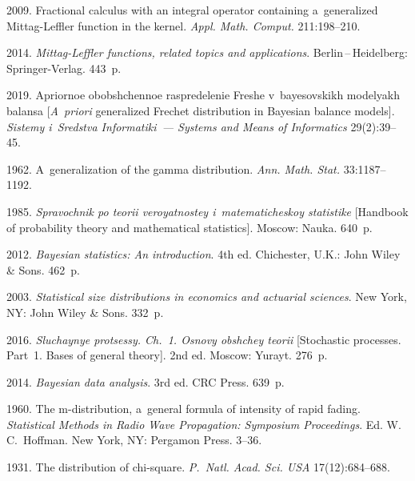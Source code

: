 \begin{multicols}{2}
{{\begin{thebibliography}{99}
 2009. Fractional calculus with 
an integral operator containing a~generalized Mittag-Leffler function in the kernel. 
 \textit{Appl. Math. Comput.} 211:198--210.

 2014.  \textit{Mittag-Leffler functions, related topics and applications}. 
 Berlin\,--\,Heidelberg: Springer-Verlag. 443~p.

 2019. Apriornoe obobshchennoe raspredelenie Freshe v~bayesovskikh modelyakh 
 balansa [\textit{A~priori} generalized Frechet distribution in Bayesian balance models]. 
  \textit{Sistemy i~Sredstva Informatiki~--- Systems and Means of Informatics}
   29(2):39--45.

 1962. A~generalization of the gamma distribution.
  \textit{Ann. Math. Stat.} 33:1187--1192.

 1985.  \textit{Spravochnik po teorii veroyatnostey i~matematicheskoy statistike} 
 [Handbook of probability theory and mathematical statistics]. 
 Moscow: Nauka. 640~p.

 2012. 
\textit{Bayesian statistics: An introduction}. 4th ed. 
Chichester, U.K.: John Wiley \& Sons. 462~p.

 2003.  \textit{Statistical size distributions in economics and actuarial sciences}. 
 New York, NY: John Wiley \& Sons. 332~p.

 2016. \textit{Sluchaynye protsessy. Ch.~1. Osnovy obshchey teorii} 
 [Stochastic processes. Part~1. Bases of general theory]. 2nd ed.
  Moscow: Yurayt. 276~p.

 2014.  \textit{Bayesian data analysis}. 3rd ed. CRC Press. 639~p.

 1960. The m-distribution, a~general formula 
of intensity of rapid fading.  \textit{Statistical Methods in 
Radio Wave Propagation: Symposium Proceedings}. 
Ed. W.\,C.~Hoffman. New York, NY: Pergamon Press. 3--36.

 1931. The distribution of chi-square. 
 \textit{P.~Natl. Acad. Sci. USA} 17(12):684--688.


\end{thebibliography}}}
\end{multicols}
